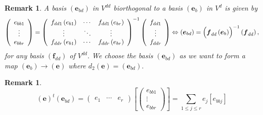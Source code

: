 \documentclass[aps,preprint]{revtex4}
\newtheorem{remark}[theorem]{Remark}
\begin{document}
\begin{remark}
A basis $\left( \boldsymbol{e}_{bd}\right) $ in $V^{dd}$ biorthogonal to a
basis $\left( \boldsymbol{e}_{b}\right) $ in $V^{d}$ is given by 
\begin{equation}
\left( 
\begin{array}{c}
e_{bb1} \\ 
\vdots \\ 
e_{bbr}%
\end{array}%
\right) =\left( 
\begin{array}{ccc}
f_{dd1}\left( e_{b1}\right) & \cdots & f_{dd1}\left( e_{br}\right) \\ 
\vdots & \ddots & \vdots \\ 
f_{ddr}\left( e_{b1}\right) & \cdots & f_{ddr}\left( e_{br}\right)%
\end{array}%
\right) ^{-1}\left( 
\begin{array}{c}
f_{dd1} \\ 
\vdots \\ 
f_{ddr}%
\end{array}%
\right) \Leftrightarrow \left( \boldsymbol{e}_{bd}\right) =\left( \overset{}{%
\boldsymbol{f}_{dd}\left( \boldsymbol{e}_{b}\right) }\right) ^{-1}\left( 
\boldsymbol{f}_{dd}\right) ,
\end{equation}%
for any basis $\left( \boldsymbol{f}_{dd}\right) $ of $V^{dd}.$ We choose
the basis $\left( \boldsymbol{e}_{bd}\right) $ as we want to form a map $%
\left( \boldsymbol{e}_{b}\right) \rightarrow \left( \boldsymbol{e}\right) $
where $d_{2}\left( \boldsymbol{e}\right) =\left( \boldsymbol{e}_{bd}\right)
. $
\end{remark}

\begin{remark}
\begin{equation}
\left( \boldsymbol{e}\right) ^{t}\left( \boldsymbol{e}_{bd}\right) =\left( 
\begin{array}{ccc}
e_{1} & \cdots & e_{r}%
\end{array}%
\right) \left[ \left( 
\begin{array}{c}
e_{bb1} \\ 
\vdots \\ 
e_{bbr}%
\end{array}%
\right) \right] =\sum_{1\leq j\leq r}e_{j}\left[ e_{bbj}\right]
\end{equation}
\end{remark}
\end{document}
